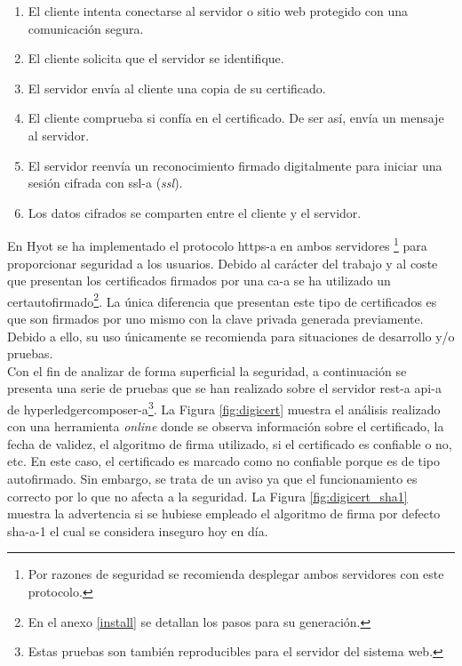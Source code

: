 \documentclass[12pt,a4paper, twoside]{report}
\begin{document}
	\begin{enumerate}
		\item El cliente intenta conectarse al servidor o sitio web protegido con una comunicación segura.
		\item El cliente solicita que el servidor se identifique.
		\item El servidor envía al cliente una copia de su certificado. 
		\item El cliente comprueba si confía en el certificado. De ser así, envía un mensaje al servidor.
		\item El servidor reenvía un reconocimiento firmado digitalmente para iniciar una sesión cifrada con \gls{ssl-a} (\textit{\gls{ssl}}).
		\item Los datos cifrados se comparten entre el cliente y el servidor.
	\end{enumerate}

	En Hyot se ha implementado el protocolo \gls{https-a} en ambos servidores \footnote{Por razones de seguridad se recomienda desplegar ambos servidores con este protocolo.} para proporcionar seguridad a los usuarios. Debido al carácter del trabajo y al coste que presentan los certificados firmados por una \gls{ca-a} se ha utilizado un \gls{certautofirmado}\footnote{En el anexo \ref{install} se detallan los pasos para su generación.}. La única diferencia que presentan este tipo de certificados es que son firmados por uno mismo con la clave privada generada previamente. Debido a ello, su uso únicamente se recomienda para situaciones de desarrollo y/o pruebas. \\

	Con el fin de analizar de forma superficial la seguridad, a continuación se presenta una serie de pruebas que se han realizado sobre el servidor \gls{rest-a} \gls{api-a} de \gls{hyperledgercomposer-a}\footnote{Estas pruebas son también reproducibles para el servidor del sistema web.}. La Figura \ref{fig:digicert} muestra el análisis realizado con una herramienta \textit{online} donde se observa información sobre el certificado, la fecha de validez, el algoritmo de firma utilizado, si el certificado es confiable o no, etc. En este caso, el certificado es marcado como no confiable porque es de tipo autofirmado. Sin embargo, se trata de un aviso ya que el funcionamiento es correcto por lo que no afecta a la seguridad. La Figura \ref{fig:digicert_sha1} muestra la advertencia si se hubiese empleado el algoritmo de firma por defecto \gls{sha-a}-1 el cual se considera inseguro hoy en día.	
		
\end{document}
